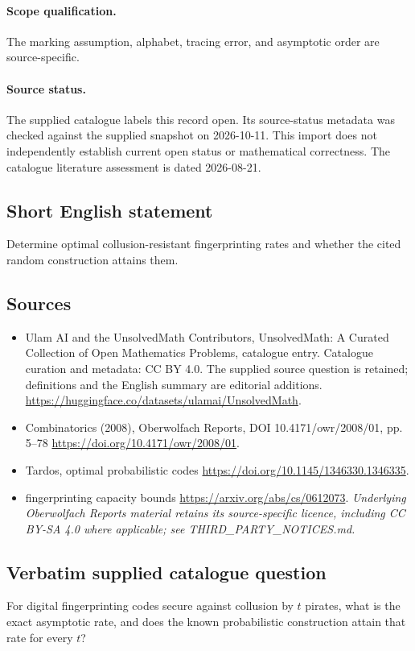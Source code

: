 \documentclass[11pt]{article}
\begin{document}
\paragraph{Scope qualification.}
The marking assumption, alphabet, tracing error, and asymptotic order are source-specific.
\paragraph{Source status.}
The supplied catalogue labels this record open. Its source-status metadata was checked against the supplied snapshot on 2026-10-11. This import does not independently establish current open status or mathematical correctness. The catalogue literature assessment is dated 2026-08-21.
\subsection{Short English statement}
Determine optimal collusion-resistant fingerprinting rates and whether the cited random construction attains them.
\subsection{Sources}
\begin{itemize}
\item[S1] Ulam AI and the UnsolvedMath Contributors, UnsolvedMath: A Curated Collection of Open Mathematics Problems, catalogue entry. Catalogue curation and metadata: CC BY 4.0. The supplied source question is retained; definitions and the English summary are editorial additions.
\url{https://huggingface.co/datasets/ulamai/UnsolvedMath}.
\item[S2] Combinatorics (2008), Oberwolfach Reports, DOI 10.4171/owr/2008/01, pp. 5--78
\url{https://doi.org/10.4171/owr/2008/01}.
\item[S3] Tardos, optimal probabilistic codes
\url{https://doi.org/10.1145/1346330.1346335}.
\item[S4] fingerprinting capacity bounds
\url{https://arxiv.org/abs/cs/0612073}.
\textit{Underlying Oberwolfach Reports material retains its source-specific licence, including CC BY-SA 4.0 where applicable; see THIRD\_PARTY\_NOTICES.md.}
\end{itemize}
\subsection{Verbatim supplied catalogue question}
For digital fingerprinting codes secure against collusion by $t$ pirates, what is the exact asymptotic rate, and does the known probabilistic construction attain that rate for every $t$?
\end{document}
